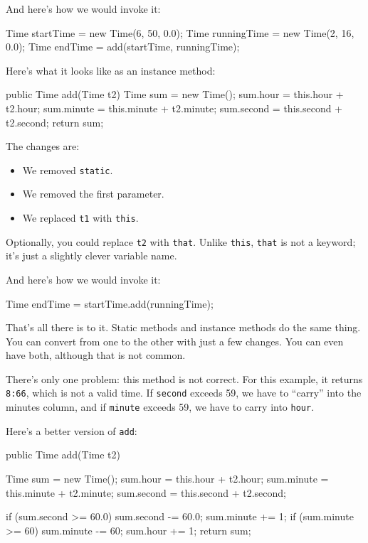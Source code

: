 \documentclass[12pt]{book}
\theoremstyle{exercise}
\newcommand{\java}[1]{\verb"#1"}
\newcommand{\java}[1]{\lstinline{#1}} %
\begin{document}
And here's how we would invoke it:

\begin{code}
    Time startTime = new Time(6, 50, 0.0);
    Time runningTime = new Time(2, 16, 0.0);
    Time endTime = add(startTime, runningTime);
\end{code}

Here's what it looks like as an instance method:


\begin{code}
    public Time add(Time t2) {
        Time sum = new Time();
        sum.hour = this.hour + t2.hour;
        sum.minute = this.minute + t2.minute;
        sum.second = this.second + t2.second;
        return sum;
    }
\end{code}

The changes are:

\begin{itemize}

\item We removed \java{static}.

\item We removed the first parameter.

\item We replaced \java{t1} with \java{this}.

\end{itemize}

Optionally, you could replace \java{t2} with \java{that}.
Unlike \java{this}, \java{that} is not a keyword; it's just a slightly clever variable name.

And here's how we would invoke it:

\begin{code}
    Time endTime = startTime.add(runningTime);
\end{code}

That's all there is to it.
Static methods and instance methods do the same thing.
You can convert from one to the other with just a few changes.
You can even have both, although that is not common.

There's only one problem: this method is not correct.
For this example, it returns {\tt 8:66}, which is not a valid time.
If \java{second} exceeds 59, we have to ``carry'' into the minutes column, and if \java{minute} exceeds 59, we have to carry into \java{hour}.

Here's a better version of \java{add}:

\begin{code}
    public Time add(Time t2) {
        Time sum = new Time();
        sum.hour = this.hour + t2.hour;
        sum.minute = this.minute + t2.minute;
        sum.second = this.second + t2.second;

        if (sum.second >= 60.0) {
            sum.second -= 60.0;
            sum.minute += 1;
        }
        if (sum.minute >= 60) {
            sum.minute -= 60;
            sum.hour += 1;
        }
        return sum;
    }
\end{code}
\end{document}
